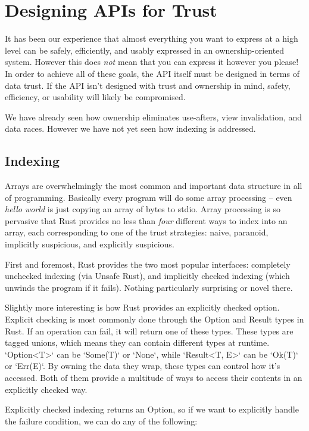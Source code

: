 \chapter{Designing APIs for Trust}
\label{ch:design}

It has been our experience that almost everything you want to express at a high level
can be safely, efficiently, and usably expressed in an ownership-oriented system.
However this does \emph{not} mean that you can express it however you please!
In order to achieve all of these goals, the API itself must be designed in
terms of data trust. If the API isn't designed with trust and ownership in mind,
safety, efficiency, or usability will likely be compromised.

We have already seen how ownership eliminates use-afters, view invalidation,
and data races. However we have not yet seen how indexing is addressed.




\section{Indexing}

Arrays are overwhelmingly
the most common and important data structure in all of programming. Basically every
program will do some array processing -- even \emph{hello world} is just copying an
array of bytes to stdio. Array processing is so pervasive that Rust provides no
less than \emph{four} different ways to index into an array, each corresponding to
one of the trust strategies: naive, paranoid, implicitly suspicious, and
explicitly suspicious.

First and foremost, Rust provides the two most popular interfaces: completely
unchecked indexing (via Unsafe Rust), and implicitly checked indexing (which
unwinds the program if it fails). Nothing particularly surprising or
novel there.

Slightly more interesting is how Rust provides an explicitly checked option.
Explicit checking is most commonly done through the Option and Result types
in Rust. If an operation can fail, it will return one of these types.
These types are tagged unions, which means they can contain different
types at runtime. `Option<T>` can be `Some(T)` or `None`, while `Result<T, E>`
can be `Ok(T)` or `Err(E)`. By owning the data they wrap, these types can control
how it's accessed. Both of them provide a multitude of ways to access their
contents in an explicitly checked way.

Explicitly checked indexing returns an Option, so if we want to explicitly
handle the failure condition, we can do any of the following:


